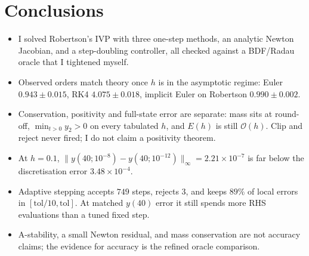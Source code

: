\documentclass[11pt,a4paper]{article}
\begin{document}
\FloatBarrier
\section{Conclusions}
\label{sec:conc}
\begin{itemize}[leftmargin=1.2em]
  \item I solved Robertson's IVP with three one-step methods, an analytic Newton Jacobian, and a step-doubling controller, all checked against a BDF/Radau oracle that I tightened myself.
  \item Observed orders match theory once \(h\) is in the asymptotic regime: Euler \(0.943\pm 0.015\), RK4 \(4.075\pm 0.018\), implicit Euler on Robertson \(0.990\pm 0.002\).
  \item Conservation, positivity and full-state error are separate: mass sits at round-off, \(\min_{t>0}y_2>0\) on every tabulated \(h\), and \(E(h)\) is still \(\mathcal{O}(h)\). Clip and reject never fired; I do not claim a positivity theorem.
  \item At \(h=0.1\), \(\|y(40;10^{-8})-y(40;10^{-12})\|_\infty=2.21\times 10^{-7}\) is far below the discretisation error \(3.48\times 10^{-4}\).
  \item Adaptive stepping accepts \(749\) steps, rejects \(3\), and keeps \(89\%\) of local errors in \([\mathrm{tol}/10,\mathrm{tol}]\). At matched \(y(40)\) error it still spends more RHS evaluations than a tuned fixed step.
  \item A-stability, a small Newton residual, and mass conservation are not accuracy claims; the evidence for accuracy is the refined oracle comparison.
\end{itemize}
\end{document}
